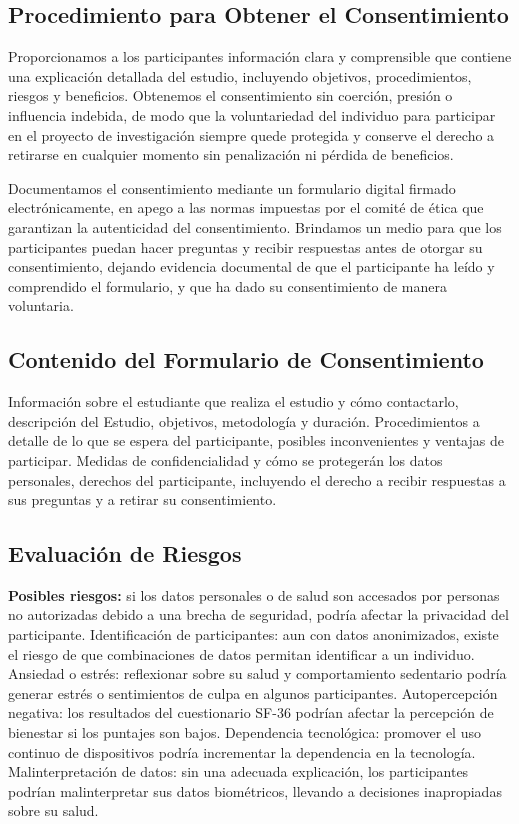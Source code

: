 \subsection{Procedimiento para Obtener el Consentimiento}
\label{subsec:procedimiento_consentimiento}

Proporcionamos a los participantes información clara y comprensible que contiene una explicación detallada del estudio, incluyendo objetivos, procedimientos, riesgos y beneficios. Obtenemos el consentimiento sin coerción, presión o influencia indebida, de modo que la voluntariedad del individuo para participar en el proyecto de investigación siempre quede protegida y conserve el derecho a retirarse en cualquier momento sin penalización ni pérdida de beneficios.

Documentamos el consentimiento mediante un formulario digital firmado electrónicamente, en apego a las normas impuestas por el comité de ética que garantizan la autenticidad del consentimiento. Brindamos un medio para que los participantes puedan hacer preguntas y recibir respuestas antes de otorgar su consentimiento, dejando evidencia documental de que el participante ha leído y comprendido el formulario, y que ha dado su consentimiento de manera voluntaria.

\subsection{Contenido del Formulario de Consentimiento}
\label{subsec:contenido_formulario_consentimiento}

Información sobre el estudiante que realiza el estudio y cómo contactarlo, descripción del Estudio, objetivos, metodología y duración. Procedimientos a detalle de lo que se espera del participante, posibles inconvenientes y ventajas de participar. Medidas de confidencialidad y cómo se protegerán los datos personales, derechos del participante, incluyendo el derecho a recibir respuestas a sus preguntas y a retirar su consentimiento.

\subsection{Evaluación de Riesgos}
\label{subsec:evaluacion_riesgos}

\textbf{Posibles riesgos:} si los datos personales o de salud son accesados por personas no autorizadas debido a una brecha de seguridad, podría afectar la privacidad del participante. Identificación de participantes: aun con datos anonimizados, existe el riesgo de que combinaciones de datos permitan identificar a un individuo. Ansiedad o estrés: reflexionar sobre su salud y comportamiento sedentario podría generar estrés o sentimientos de culpa en algunos participantes. Autopercepción negativa: los resultados del cuestionario SF-36 podrían afectar la percepción de bienestar si los puntajes son bajos. Dependencia tecnológica: promover el uso continuo de dispositivos podría incrementar la dependencia en la tecnología. Malinterpretación de datos: sin una adecuada explicación, los participantes podrían malinterpretar sus datos biométricos, llevando a decisiones inapropiadas sobre su salud.

